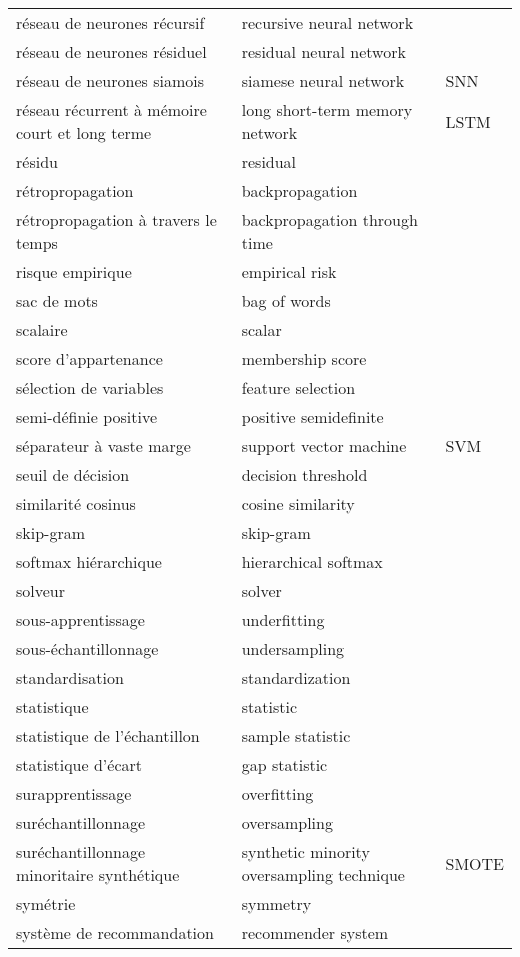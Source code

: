 \begin{longtable}{p{} p{} p{}}
réseau de neurones récursif & recursive neural network &  \\ 
réseau de neurones résiduel & residual neural network &  \\ 
réseau de neurones siamois & siamese neural network & SNN \\ 
réseau récurrent à mémoire court et long terme & long short-term memory network & LSTM \\ 
résidu & residual &  \\ 
rétropropagation & backpropagation &  \\ 
rétropropagation à travers le temps & backpropagation through time &  \\ 
risque empirique & empirical risk &  \\ 
sac de mots & bag of words &  \\ 
scalaire & scalar &  \\ 
score d’appartenance & membership score &  \\ 
sélection de variables & feature selection &  \\ 
semi-définie positive & positive semidefinite &  \\ 
séparateur à vaste marge & support vector machine & SVM \\ 
seuil de décision & decision threshold &  \\ 
similarité cosinus & cosine similarity &  \\ 
skip-gram & skip-gram &  \\ 
softmax hiérarchique & hierarchical softmax &  \\ 
solveur & solver &  \\ 
sous-apprentissage & underfitting &  \\ 
sous-échantillonnage & undersampling &  \\ 
standardisation & standardization &  \\ 
statistique & statistic &  \\ 
statistique de l’échantillon & sample statistic &  \\ 
statistique d'écart & gap statistic &  \\ 
surapprentissage & overfitting &  \\ 
suréchantillonnage & oversampling &  \\ 
suréchantillonnage minoritaire synthétique & synthetic minority oversampling technique & SMOTE  \\ 
symétrie & symmetry &  \\ 
système de recommandation & recommender system &  \\ 

\end{longtable}
